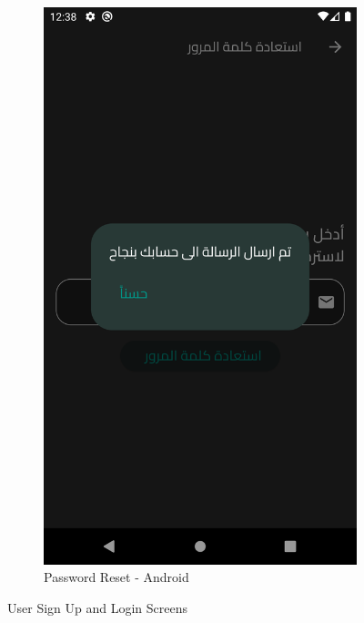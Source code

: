 \documentclass[a4paper, 12pt]{report} %
\begin{document}
\begin{figure}[H]
\begin{subfigure}{0.3\textwidth}
                    \includegraphics[width=0.8\linewidth, height=0.9\textheight, keepaspectratio]{Images/password_reset.png}
                    \caption{Password Reset - Android}
                    \label{fig:password_reset}
                \end{subfigure}
                \caption{User Sign Up and Login Screens}
                \label{fig:real_sign_up_login}
            \end{figure}
        
        \pagebreak
\end{document}
